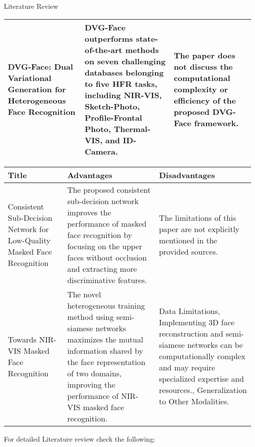 \begin{frame}[allowframebreaks]{Literature Review}
{\begin{table}[htbp]
\begin{center}
\begin{tabularx}{\columnwidth}{|X|X|X|}
			\\
			\hline
			DVG-Face: Dual Variational Generation for Heterogeneous Face Recognition \cite{fu_dvg-face_2022} & DVG-Face outperforms state-of-the-art methods on seven challenging databases belonging to five HFR tasks, including NIR-VIS, Sketch-Photo, Profile-Frontal Photo, Thermal-VIS, and ID-Camera. & The paper does not discuss the computational complexity or efficiency of the proposed DVG-Face framework.			\\
			\hline
		\end{tabularx}
		\end{center}
		\end{table}	
	\pagebreak	
		\begin{table}[htbp]
			\begin{center}
			\begin{tabularx}{\columnwidth}{|X|X|X|}
			\hline
			\textbf{Title} & \textbf{Advantages}& \textbf{Disadvantages} \\
			\hline
			Consistent Sub-Decision Network for Low-Quality Masked Face Recognition \cite{zhao_consistent_2022} & The proposed consistent sub-decision network improves the performance of masked face recognition by focusing on the upper faces without occlusion and extracting more discriminative features. & The limitations of this paper are not explicitly mentioned in the provided sources.
			\\
			\hline
			Towards NIR-VIS Masked Face Recognition \cite{du_towards_2021} & The novel heterogeneous training method using semi-siamese networks maximizes the mutual information shared by the face representation of two domains, improving the performance of NIR-VIS masked face recognition. & Data Limitations,  Implementing 3D face reconstruction and semi-siamese networks can be computationally complex and may require specialized expertise and resources., Generalization to Other Modalities.		\\
			\hline
		\end{tabularx}
		\end{center}
		\end{table}		
		For detailed Literature review check the following: \textcolor{blue}{\underline{}}
	}	
\end{frame}

